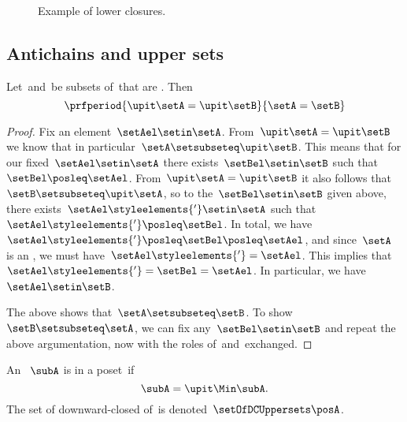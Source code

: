 \begin{figure*}[h!]
    \centering
    \hfill
    \hfill
    \caption{Example of lower closures.}
    \label{fig:examplebatt}
\end{figure*}

\subsection{Antichains and upper sets}

\begin{lemma}
    \label{lem:up-cl-inj-antichains}
    Let~\setA and~\setB be subsets of~\posA that are .
    Then
    \begin{equation}
        \prfperiod{
            \upit \setA = \upit \setB
        }{
            \setA = \setB
        }
    \end{equation}
\end{lemma}

\begin{proof}
    Fix an element~$\setAel \setin \setA$.
    From~$\upit \setA = \upit \setB$ we know that in particular~$\setA \setsubseteq \upit \setB$.
    This means that for our fixed~$\setAel \setin \setA$ there exists~$\setBel \setin \setB$ such that~$\setBel \posleq \setAel$.
    From~$\upit \setA = \upit \setB$ it also follows that~$\setB \setsubseteq \upit \setA$, so to the~$\setBel \setin \setB$ given above, there exists~$\setAel\styleelements{'} \setin \setA$ such that~$\setAel\styleelements{'} \posleq \setBel$.
    In total, we have~$\setAel\styleelements{'} \posleq \setBel \posleq \setAel$, and since~$\setA$ is an , we must have~$\setAel\styleelements{'} = \setAel$.
    This implies that~$\setAel\styleelements{'} = \setBel = \setAel$.
    In particular, we have~$\setAel \setin \setB$.

    The above shows that~$\setA \setsubseteq \setB$.
    To show~$\setB \setsubseteq \setA$, we can fix any~$\setBel \setin \setB$ and repeat the above argumentation, now with the roles of~\setA and~\setB exchanged.
\end{proof}

\begin{definition}
    \label{def:downward-closed-upperset}
    An ~$\subA$ is  in a poset~\posA if
    \begin{equation}
        \subA = \upit \Min \subA.
    \end{equation}
    The set of downward-closed  of~\posA is denoted~$\setOfDCUppersets \posA$.

\end{definition}


